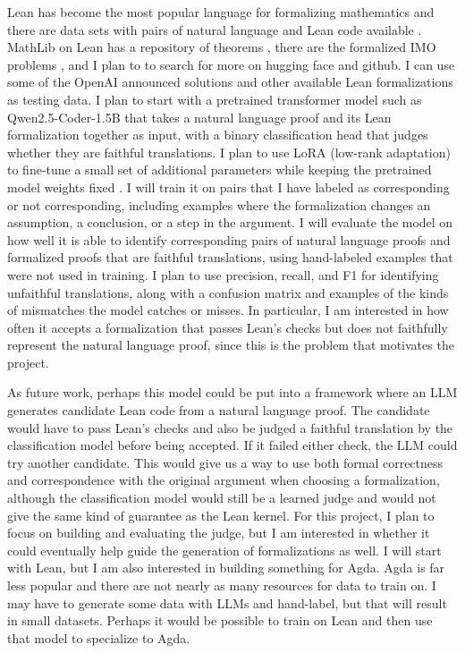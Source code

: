 \documentclass[12pt]{article}
\begin{document}
Lean has become the most popular language for formalizing mathematics and there are data sets with pairs of natural language and Lean code available \citep{compfiles,informath}. MathLib on Lean has a repository of theorems \citep{mathlib4,lean1000}, there are the formalized IMO problems \citep{compfiles}, and I plan to to search for more on hugging face and github. I can use some of the OpenAI announced solutions and other available Lean formalizations as testing data. I plan to start with a pretrained transformer model such as Qwen2.5-Coder-1.5B \citep{qwenCoder} that takes a natural language proof and its Lean formalization together as input, with a binary classification head that judges whether they are faithful translations. I plan to use LoRA (low-rank adaptation) to fine-tune a small set of additional parameters while keeping the pretrained model weights fixed \citep{hu2022lora}. I will train it on pairs that I have labeled as corresponding or not corresponding, including examples where the formalization changes an assumption, a conclusion, or a step in the argument. I will evaluate the model on how well it is able to identify corresponding pairs of natural language proofs and formalized proofs that are faithful translations, using hand-labeled examples that were not used in training. I plan to use precision, recall, and F1 for identifying unfaithful translations, along with a confusion matrix and examples of the kinds of mismatches the model catches or misses. In particular, I am interested in how often it accepts a formalization that passes Lean's checks but does not faithfully represent the natural language proof, since this is the problem that motivates the project.

As future work, perhaps this model could be put into a framework where an LLM generates candidate Lean code from a natural language proof. The candidate would have to pass Lean's checks and also be judged a faithful translation by the classification model before being accepted. If it failed either check, the LLM could try another candidate. This would give us a way to use both formal correctness and correspondence with the original argument when choosing a formalization, although the classification model would still be a learned judge and would not give the same kind of guarantee as the Lean kernel. For this project, I plan to focus on building and evaluating the judge, but I am interested in whether it could eventually help guide the generation of formalizations as well. I will start with Lean, but I am also interested in building something for Agda. Agda is far less popular and there are not nearly as many resources for data to train on. I may have to generate some data with LLMs and hand-label, but that will result in small datasets. Perhaps it would be possible to train on Lean and then use that model to specialize to Agda.
\end{document}
